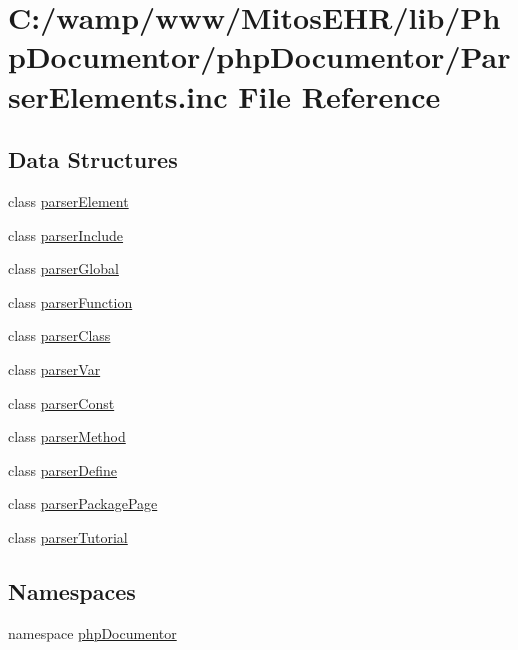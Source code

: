 \hypertarget{_parser_elements_8inc}{\section{\-C\-:/wamp/www/\-Mitos\-E\-H\-R/lib/\-Php\-Documentor/php\-Documentor/\-Parser\-Elements.inc \-File \-Reference}
\label{_parser_elements_8inc}
}
\subsection*{\-Data \-Structures}
\begin{DoxyCompactItemize}
\item 
class \hyperlink{classparser_element}{parser\-Element}
\item 
class \hyperlink{classparser_include}{parser\-Include}
\item 
class \hyperlink{classparser_global}{parser\-Global}
\item 
class \hyperlink{classparser_function}{parser\-Function}
\item 
class \hyperlink{classparser_class}{parser\-Class}
\item 
class \hyperlink{classparser_var}{parser\-Var}
\item 
class \hyperlink{classparser_const}{parser\-Const}
\item 
class \hyperlink{classparser_method}{parser\-Method}
\item 
class \hyperlink{classparser_define}{parser\-Define}
\item 
class \hyperlink{classparser_package_page}{parser\-Package\-Page}
\item 
class \hyperlink{classparser_tutorial}{parser\-Tutorial}
\end{DoxyCompactItemize}
\subsection*{\-Namespaces}
\begin{DoxyCompactItemize}
\item 
namespace \hyperlink{namespacephp_documentor}{php\-Documentor}
\end{DoxyCompactItemize}
